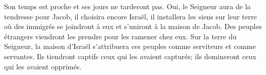 Son temps est proche et ses jours ne tarderont pas.
Oui, le Seigneur aura de la tendresse pour Jacob, il choisira encore Israël,
	il installera les siens sur leur terre
	où des immigrés se joindront à eux et s’uniront à la maison de Jacob.
Des peuples étrangers viendront les prendre pour les ramener chez eux.
Sur la terre du Seigneur,
	la maison d’Israël s’attribuera ces peuples
		comme serviteurs et comme servantes.
Ils tiendront captifs ceux qui les avaient capturés;
	ils domineront ceux qui les avaient opprimés.
